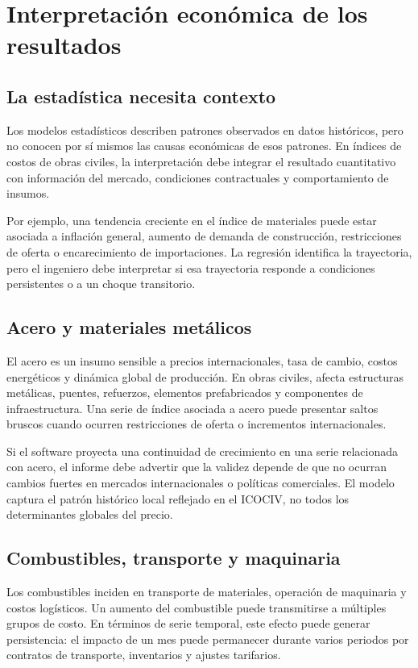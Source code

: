 \section{Interpretación económica de los resultados}

\subsection{La estadística necesita contexto}

Los modelos estadísticos describen patrones observados en datos históricos, pero no conocen por sí mismos las causas económicas de esos patrones. En índices de costos de obras civiles, la interpretación debe integrar el resultado cuantitativo con información del mercado, condiciones contractuales y comportamiento de insumos.

Por ejemplo, una tendencia creciente en el índice de materiales puede estar asociada a inflación general, aumento de demanda de construcción, restricciones de oferta o encarecimiento de importaciones. La regresión identifica la trayectoria, pero el ingeniero debe interpretar si esa trayectoria responde a condiciones persistentes o a un choque transitorio.

\subsection{Acero y materiales metálicos}

El acero es un insumo sensible a precios internacionales, tasa de cambio, costos energéticos y dinámica global de producción. En obras civiles, afecta estructuras metálicas, puentes, refuerzos, elementos prefabricados y componentes de infraestructura. Una serie de índice asociada a acero puede presentar saltos bruscos cuando ocurren restricciones de oferta o incrementos internacionales.

Si el software proyecta una continuidad de crecimiento en una serie relacionada con acero, el informe debe advertir que la validez depende de que no ocurran cambios fuertes en mercados internacionales o políticas comerciales. El modelo captura el patrón histórico local reflejado en el ICOCIV, no todos los determinantes globales del precio.

\subsection{Combustibles, transporte y maquinaria}

Los combustibles inciden en transporte de materiales, operación de maquinaria y costos logísticos. Un aumento del combustible puede transmitirse a múltiples grupos de costo. En términos de serie temporal, este efecto puede generar persistencia: el impacto de un mes puede permanecer durante varios periodos por contratos de transporte, inventarios y ajustes tarifarios.

